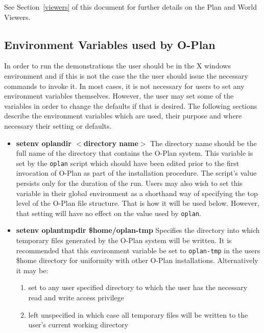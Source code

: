 See Section~\ref{viewers} of this document for further details on the
Plan and World Viewers.

\subsection{\protect\label{variables}Environment Variables used by O-Plan}
In order to run the demonstrations the user should be in the X windows
environment and if this is not the case the the user should issue the
necessary commands to invoke it. In most cases, it is not necessary
for users to set any environment variables themselves.  However, the
user may set some of the variables in order to change the defaults if
that is desired.  The following sections describe the environment
variables which are used, their purpose and where necessary their
setting or defaults.

\begin{itemize}
\item {\bf setenv {\sc oplandir} $<$directory name$>$} \newline
The directory name should be the full name of the directory that
contains the O-Plan system.  This variable is set by the {\tt oplan}
script which should have been edited prior to the first invocation of
O-Plan as part of the installation procedure. The script's value
persists only for the duration of the run.  Users may also wish to set
this variable in their global environment as a shorthand way of
specifying the top level of the O-Plan file structure.  That is how it
will be used below.  However, that setting will have no effect on the
value used by {\tt oplan}.

\item {\bf setenv {\sc oplantmpdir} \${\sc home}/oplan-tmp} \newline
Specifies the directory into which temporary files generated by the
O-Plan system will be written.  It is recommended that this
environment variable be set to {\tt oplan-tmp} in the users
\${\sc home} directory for uniformity with other O-Plan installations.
Alternatively it may be:

\begin{enumerate}
\item set to any user specified directory to which the user has the necessary
read and write access privilege
\item left unspecified in which case all temporary files will be
written to the user's current working directory
\end{enumerate}
\end{itemize}

